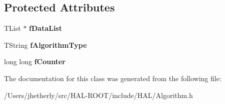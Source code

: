 \subsection*{Protected Attributes}
\begin{DoxyCompactItemize}
\item 
\hypertarget{class_h_a_l_1_1_algorithm_aacc4824bcc223fc86f0f57662393e56c}{T\+List $\ast$ {\bfseries f\+Data\+List}}\label{class_h_a_l_1_1_algorithm_aacc4824bcc223fc86f0f57662393e56c}

\item 
\hypertarget{class_h_a_l_1_1_algorithm_a15bbd1834a2413957b2946e051584d49}{T\+String {\bfseries f\+Algorithm\+Type}}\label{class_h_a_l_1_1_algorithm_a15bbd1834a2413957b2946e051584d49}

\item 
\hypertarget{class_h_a_l_1_1_algorithm_a91a834bebb25ccc2e4324fcaf51bf294}{long long {\bfseries f\+Counter}}\label{class_h_a_l_1_1_algorithm_a91a834bebb25ccc2e4324fcaf51bf294}

\end{DoxyCompactItemize}


The documentation for this class was generated from the following file\+:\begin{DoxyCompactItemize}
\item 
/\+Users/jhetherly/src/\+H\+A\+L-\/\+R\+O\+O\+T/include/\+H\+A\+L/Algorithm.\+h\end{DoxyCompactItemize}
